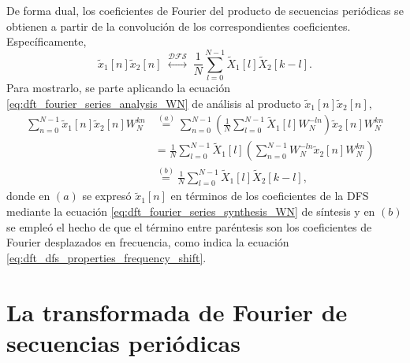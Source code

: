 \documentclass[a4paper]{report}
\begin{document}
De forma dual, los coeficientes de Fourier del producto de secuencias periódicas se obtienen a partir de la convolución de los correspondientes coeficientes. Específicamente,
\begin{equation}\label{eq:dft_dfs_properties_time_product}
 \tilde{x}_1[n]\tilde{x}_2[n]
 \;\overset{\mathcal{DFS}}{\longleftrightarrow}\;
 \frac{1}{N}\sum_{l=0}^{N-1}\tilde{X}_1[l]\tilde{X}_2[k-l].
\end{equation}
Para mostrarlo, se parte aplicando la ecuación \ref{eq:dft_fourier_series_analysis_WN}  de análisis al producto \(\tilde{x}_1[n]\tilde{x}_2[n]\),
\begin{align*}
 \sum_{n=0}^{N-1}\tilde{x}_1[n]\tilde{x}_2[n]W_N^{kn}&\overset{(a)}{=}\sum_{n=0}^{N-1}\left(\frac{1}{N}\sum_{l=0}^{N-1}\tilde{X}_1[l]W_N^{-ln}\right)\tilde{x}_2[n]W_N^{kn}\\
  &=\frac{1}{N}\sum_{l=0}^{N-1}\tilde{X}_1[l]\left(\sum_{n=0}^{N-1}W_N^{-ln}\tilde{x}_2[n]W_N^{kn}\right)\\
  &\overset{(b)}{=}\frac{1}{N}\sum_{l=0}^{N-1}\tilde{X}_1[l]\tilde{X}_2[k-l],
\end{align*}
donde en \((a)\) se expresó \(\tilde{x}_1[n]\) en términos de los coeficientes de la DFS mediante la ecuación \ref{eq:dft_fourier_series_synthesis_WN} de síntesis y en \((b)\) se empleó el hecho de que el término entre paréntesis son los coeficientes de Fourier desplazados en frecuencia, como indica la ecuación  \ref{eq:dft_dfs_properties_frequency_shift}.

\section{La transformada de Fourier de secuencias periódicas}
\end{document}
